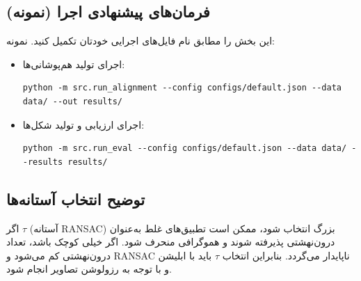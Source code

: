 
\subsection{فرمان‌های پیشنهادی اجرا (نمونه)}
این بخش را مطابق نام فایل‌های اجرایی خودتان تکمیل کنید. نمونه:
\begin{itemize}
  \item اجرای تولید هم‌پوشانی‌ها:
\begin{verbatim}
python -m src.run_alignment --config configs/default.json --data data/ --out results/
\end{verbatim}
  \item اجرای ارزیابی و تولید شکل‌ها:
\begin{verbatim}
python -m src.run_eval --config configs/default.json --data data/ --results results/
\end{verbatim}
\end{itemize}

\subsection{توضیح انتخاب آستانه‌ها}
اگر $\tau$ (آستانه RANSAC) بزرگ انتخاب شود، ممکن است تطبیق‌های غلط به‌عنوان درون‌نهشتی پذیرفته شوند و هموگرافی منحرف شود. اگر خیلی کوچک باشد، تعداد درون‌نهشتی کم می‌شود و RANSAC ناپایدار می‌گردد. بنابراین انتخاب $\tau$ باید با ابلیشن و با توجه به رزولوشن تصاویر انجام شود.
